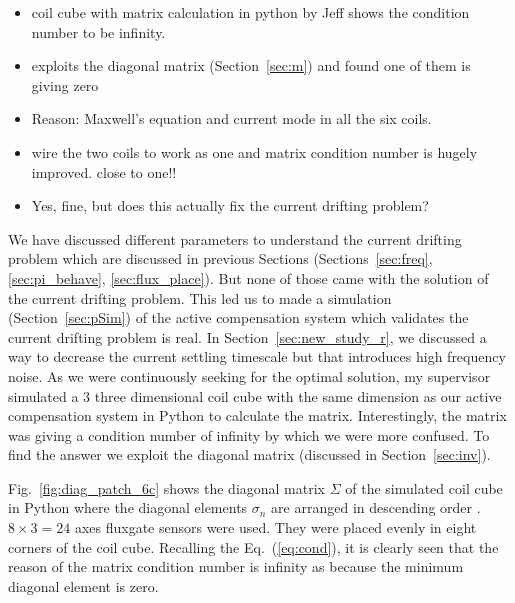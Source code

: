 \begin{itemize}
\item coil cube with matrix calculation in python by Jeff shows the condition number to be infinity.
\item exploits the diagonal matrix (Section~\ref{sec:m}) and found one of them is giving zero
\item Reason: Maxwell's equation and current mode in all the six coils.
\item wire the two coils to work as one and matrix condition number is hugely improved. close to one!!
\item Yes, fine, but does this actually fix the current drifting problem?
\end{itemize}


We have discussed different parameters to understand the current drifting problem which are discussed in previous Sections (Sections~\ref{sec:freq}, \ref{sec:pi_behave}, \ref{sec:flux_place}). But none of those came with the solution of the current drifting problem. This led us to made a simulation (Section~\ref{sec:pSim}) of the active compensation system which validates the current drifting problem is real. In Section~\ref{sec:new_study_r}, we discussed a way to decrease the current settling timescale but that introduces high frequency noise. As we were continuously seeking for the optimal solution, my supervisor simulated a 3 three dimensional coil cube with the same dimension as our active compensation system in Python to calculate the matrix. Interestingly, the matrix was giving a condition number of infinity by which we were more confused. To find the answer we exploit the diagonal matrix (discussed in Section~\ref{sec:inv}).


Fig.~\ref{fig:diag_patch_6c} shows the diagonal matrix $\Sigma$ of the simulated coil cube in Python where the diagonal elements $\sigma_n$ are arranged in descending order . $8\times3=24$ axes fluxgate sensors were used. They were placed evenly in eight corners of the coil cube.  Recalling the Eq.~(\ref{eq:cond}), it is clearly seen that the reason of the matrix condition number is infinity as because the minimum diagonal element is zero. 

